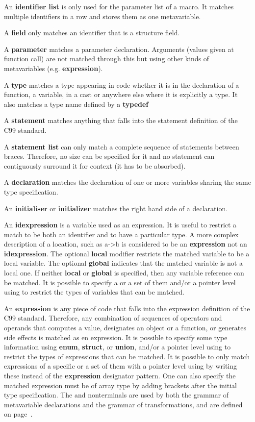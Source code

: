 An {\bf identifier list} is only used for the parameter list of a macro. It
matches multiple identifiers in a row and stores them as one metavariable.

A {\bf field} only matches an identifier that is a structure field.

A {\bf parameter} matches a parameter declaration. Arguments (values given at
function call) are not matched through this but using other kinds of
metavariables (e.g. {\bf expression}).

A {\bf type} matches a type appearing in code whether it is in the declaration
of a function, a variable, in a cast or anywhere else where it is explicitly a
type. It also matches a type name defined by a {\bf typedef}

A {\bf statement} matches anything that falls into the statement definition of
the C99 standard.

A {\bf statement list} can only match a complete sequence of statements between
braces. Therefore, no size can be specified for it and no statement can
contiguously surround it for context (it has to be absorbed).

A {\bf declaration} matches the declaration of one or more variables sharing
the same type specification.

An {\bf initialiser} or {\bf initializer} matches the right hand side of a
declaration.

An {\bf idexpression} is a variable used as an expression. It is useful to
restrict a match to be both an identifier and to have a particular type.
A more complex description of a location, such as a->b is considered to be an
{\bf expression} not an {\bf idexpression}. The optional {\bf local} modifier
restricts the matched variable to be a local variable. The optional {\bf global}
indicates that the matched variable is not a local one. If neither {\bf local} or
{\bf global} is specified, then any variable reference can be matched.
It is possible to specify a  or a set of them and/or a pointer level
using {\tt *} to restrict the types of variables that can be matched.

An {\bf expression} is any piece of code that falls into the expression
definition of the C99 standard. Therefore, any combination of sequences of
operators and operands that computes a value, designates an object or a
function, or generates side effects is matched as en expression.
It is possible to specify some type information using {\bf enum}, {\bf struct},
or {\bf union}, and/or a pointer level using {\tt *} to restrict the types of
expressions that can be matched.
It is possible to only match expressions of a specific  or a set of
them with a pointer level using {\tt *} by writing these instead of the
{\bf expression} designator pattern. One can also specify the matched
expression must be of array type by adding brackets after the initial type
specification.
The  and  nonterminals are used by both the grammar of
metavariable declarations and the grammar of transformations, and are
defined on page~\pageref{types}.

